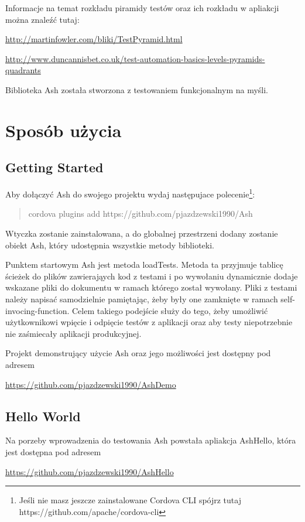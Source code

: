 \documentclass[brudnopis]{xmgr}
\begin{document}
Informacje na temat rozkładu piramidy testów oraz ich rozkładu w apliakcji można znaleźć tutaj:

\url{http://martinfowler.com/bliki/TestPyramid.html}

\url{http://www.duncannisbet.co.uk/test-automation-basics-levels-pyramids-quadrants}

Biblioteka Ash została stworzona z testowaniem funkcjonalnym na myśli.

\chapter{Sposób użycia}
\section{Getting Started}

Aby dołączyć Ash do swojego projektu wydaj następujace polecenie\footnote{Jeśli nie masz jeszcze zainstalowane Cordova CLI spójrz tutaj https://github.com/apache/cordova-cli}:
\begin{quote}
   cordova plugins add https://github.com/pjazdzewski1990/Ash
\end{quote}

Wtyczka zostanie zainstalowana, a do globalnej przestrzeni dodany zostanie obiekt Ash, który udostępnia wszystkie metody biblioteki.

Punktem startowym Ash jest metoda loadTests. Metoda ta przyjmuje tablicę ścieżek do plików zawierająych kod z testami i po wywołaniu dynamicznie dodaje wskazane pliki do dokumentu w ramach którego został wywołany. Pliki z testami należy napisać samodzielnie pamiętając, żeby były one zamknięte w ramach self-invocing-function. Celem takiego podejście służy do tego, żeby umożliwić użytkownikowi wpięcie i odpięcie testów z aplikacji oraz aby testy niepotrzebnie nie zaśmiecały aplikacji produkcyjnej.

Projekt demonstrujący użycie Ash oraz jego możliwości jest dostępny pod adresem

\url{https://github.com/pjazdzewski1990/AshDemo}

\section{Hello World}

Na porzeby wprowadzenia do testowania Ash powstała apliakcja AshHello, która jest dostępna pod adresem 

\url{https://github.com/pjazdzewski1990/AshHello}
\end{document}

